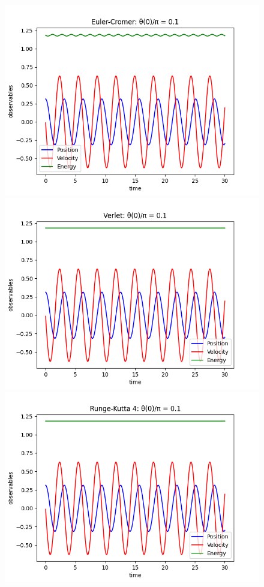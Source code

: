 \documentclass[a4paper,12pt]{article}
\begin{document}
\begin{figure}[!ht]
  \centering
  \begin{minipage}{0.45\textwidth}
    \includegraphics[width=\textwidth]{img/1-euler-cromer-0-1.png}
  \end{minipage}
  \begin{minipage}{0.45\textwidth}
    \includegraphics[width=\textwidth]{img/1-verlet-0-1.png}
  \end{minipage}
  \includegraphics[scale=0.45]{img/1-runge-kutta-0-1.png}

\end{figure}
\end{document}
